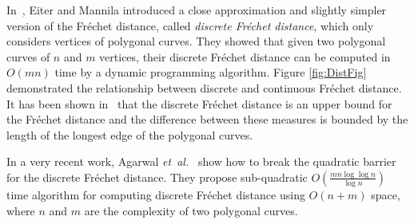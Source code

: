 \documentclass[12pt]{dalthesis}
\newcommand{\etal}{{\em et~al.\/}}
\newcommand{\REM}[1]{}
\newcommand{\Frechet}{Fr\'echet }
\begin{document}
In~\cite{DisceteFD}, Eiter and Mannila 
introduced a 
close approximation and slightly simpler version of the \Frechet distance, called {\em discrete 
\Frechet distance}, which
only considers vertices of polygonal curves.
They showed that given two polygonal curves of $n$ and $m$ vertices, their discrete 
\Frechet distance can be computed  in $O(mn)$ time by a dynamic programming algorithm. 
Figure \ref{fig:DistFig} demonstrated the relationship between discrete 
and continuous \Frechet distance. 
It has been shown in~\cite{DisceteFD} that the discrete \Frechet distance is an 
upper bound for the \Frechet distance and the difference between these measures 
is bounded by the length of the longest edge of the polygonal 
curves. 
\REM{


Given a polygonal curve $P = \langle p_1,...,p_n\rangle$ of $n$ vertices, let
a $k$-walk along $P$ be a partitioning of $P$ into $k$  disjoint non-empty
subsets $\{P_i\}_{i=1..k}$. 
Assume two polygonal curves $P$  and $Q$ with 
the sequence of endpoints of $P = \langle p_1,...,p_n \rangle$ and $Q = \langle q_1,...,q_m \rangle$, respectively. 
A paired walk along $P$ and $Q$ is a $k$-walk $\{P_i\}_{i=1..k}$ along $P$ and a 
$k$-walk $\{Q_i\}_{i=1..k}$ s.t. for $1 \le i \le k$
either $|P_i| = 1$ or $|Q_i| = 1$ ( i.e., either $P_i$ or $Q_i$ contains exactly one vertex). 
Consider again the scenario in which the person walks along $P$
and the dog walks along $Q$. Then, the definition of paired walk 
is based on the three following cases: 
\begin{flushleft}
(1)  $| Q_i| > |P_i| =1 $ : the dog moves forward and the person stays.

(2)  $| P_i| > |Q_i| =1 $ : the person moves forward and the dog stays.

(3)  $| Q_i| = |P_i| =1 $ : both the person and the dog move forward.
\end{flushleft}


The cost of a paired walk $W = \{ (P_i,Q_i)\}$ along 
two curves $P$ and $Q$ is defined as 
$$
C_W(P_i,Q_i) = \max_{i} \max_{(a,b) \in P_i \times Q_i} dist (a,b).
	$$

Then, the discrete \Frechet distance between two polygonal curves 
$P$ and $Q$ :
$$\distDisF(P,Q) = \min C_W(P,Q).$$
}



In a very recent work, 
Agarwal \etal~\cite{DiscreteSUBQuadractic} 
show how to break the quadratic barrier for the discrete \Frechet distance. 
They propose sub-quadratic 
$O(\frac{mn \log \log n}{\log n})$ time
algorithm for computing discrete \Frechet distance 
using $O(n+m)$ space, 
where $n$ and $m$ are the complexity of 
two polygonal curves. 
\end{document}
